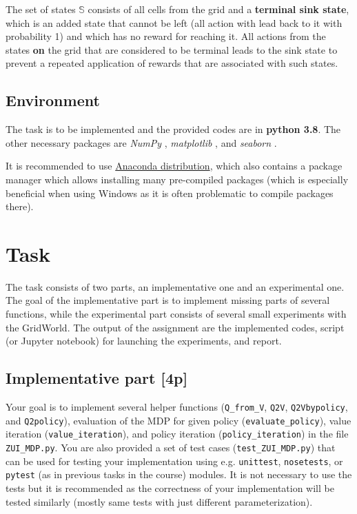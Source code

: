 \documentclass[10pt,journal,compsoc,twoside]{IEEEtran}
\begin{document}
The set of states $\mathbb{S}$ consists of all cells from the grid and a \textbf{terminal sink state}, which is an added state that cannot be left (all action with lead back to it with probability 1) and which has no reward for reaching it. All actions from the states \textbf{on} the grid that are considered to be terminal leads to the sink state to prevent a repeated application of rewards that are associated with such states.

\subsection{Environment}
The task is to be implemented and the provided codes are in \textbf{python 3.8}. The other necessary packages are \textit{NumPy} \cite{numpy}, \textit{matplotlib} \cite{matplotlib}, and \textit{seaborn} \cite{seaborn}.

It is recommended to use \href{https://www.anaconda.com/download/}{Anaconda distribution}, which also contains a package manager which allows installing many pre-compiled packages (which is especially beneficial when using Windows as it is often problematic to compile packages there).

\section{Task}
The task consists of two parts, an implementative one and an experimental one. The goal of the implementative part is to implement missing parts of several functions, while the experimental part consists of several small experiments with the GridWorld. The output of the assignment are the implemented codes, script (or Jupyter notebook) for launching the experiments, and report.

\subsection{Implementative part [4p]}
Your goal is to implement several helper functions (\lstinline{Q_from_V}, \lstinline{Q2V}, \lstinline{Q2Vbypolicy}, and \lstinline{Q2policy}), evaluation of the MDP for given policy (\lstinline{evaluate_policy}), value iteration (\lstinline{value_iteration}), and policy iteration (\lstinline{policy_iteration}) in the file \texttt{ZUI\_MDP.py}. You are also provided a set of test cases (\texttt{test\_ZUI\_MDP.py}) that can be used for testing your implementation using e.g. \texttt{unittest}, \texttt{nosetests}, or \texttt{pytest} (as in previous tasks in the course) modules. It is not necessary to use the tests but it is recommended as the correctness of your implementation will be tested similarly (mostly same tests with just different parameterization). 
\end{document}
